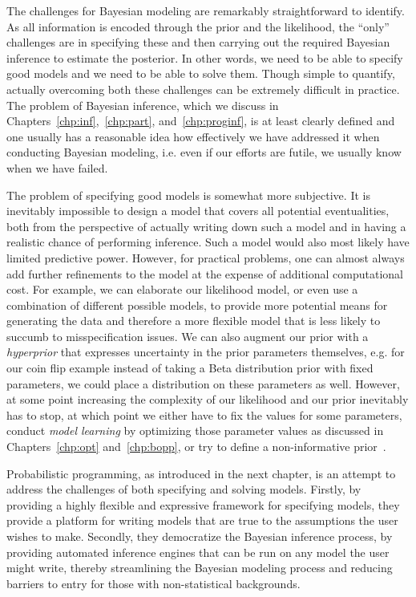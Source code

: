 The challenges for Bayesian modeling are remarkably straightforward to identify.  As all information
is encoded through the prior and the likelihood, the ``only'' challenges are in specifying these
and then carrying out the required Bayesian inference to estimate the posterior.  In other words, we need
to be able to specify good models and we need to be able to solve them.  Though simple to
quantify, actually overcoming both these challenges can be extremely difficult in practice.  The problem
of Bayesian inference, which we discuss in Chapters~\ref{chp:inf},~\ref{chp:part}, and~\ref{chp:proginf},
 is at least clearly defined and one usually has a reasonable idea
how effectively we have addressed it when conducting Bayesian modeling, i.e. even if our efforts are
futile, we usually know when we have failed.  

The problem of specifying good models is somewhat more subjective.  It is inevitably impossible
to design a model that covers all potential eventualities, both from the perspective of actually writing
down such a model and in having a realistic chance of performing inference.  Such a model
would also most likely have limited predictive power.  However, for practical problems, one can almost always
add further refinements to the model at the expense of additional computational cost. For example, we can
elaborate our likelihood model, or even use a combination of different possible models, to provide more 
potential means  for generating the data and therefore a more flexible model that is less likely to 
succumb to misspecification issues.  We can also augment our prior with a \emph{hyperprior} that 
expresses uncertainty in the prior parameters themselves, e.g. for our coin flip example instead of
taking a Beta distribution prior with fixed parameters, we could place a distribution on these parameters
as well.  However, at some point increasing the complexity of our likelihood and our prior inevitably 
has to stop, at which point we either have to fix the values for some parameters, conduct
\emph{model learning} by optimizing those parameter values as discussed in Chapters~\ref{chp:opt}
and~\ref{chp:bopp}, or try to define a non-informative prior~\citep{robert2007bayesian}.


Probabilistic programming, as introduced in the next chapter, is an
attempt to address the challenges of both specifying and solving models.  
Firstly, by providing a highly flexible and expressive framework for specifying models, 
they provide a platform for writing models that are true to the assumptions the user wishes
to make.  Secondly, they democratize the Bayesian inference process, by providing automated
inference engines that can be run on any model the user might write, thereby streamlining the Bayesian
modeling process and reducing barriers to entry for those with non-statistical backgrounds.